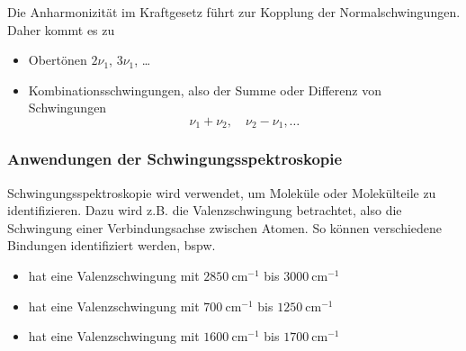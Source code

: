 	Die Anharmonizität im Kraftgesetz führt zur Kopplung der Normalschwingungen. Daher kommt es zu
	\begin{itemize}
		\item Obertönen $2 \nu_1$, $3 \nu_1$, \ldots
		\item Kombinationsschwingungen, also der Summe oder Differenz von Schwingungen
			$$
			\nu_1 + \nu_2, \quad \nu_2 - \nu_1, \ldots
			$$ 
	\end{itemize}

\subsubsection{Anwendungen der Schwingungsspektroskopie}
	Schwingungsspektroskopie wird verwendet, um Moleküle oder Molekülteile zu identifizieren. Dazu wird z.B. die Valenzschwingung betrachtet, also die Schwingung einer Verbindungsachse zwischen Atomen. So können verschiedene Bindungen identifiziert werden, bspw.
	\begin{itemize}
		\item {} hat eine Valenzschwingung mit $\SI{2850}{\centi \meter ^{-1}}$ bis $\SI{3000}{\centi \meter ^{-1}}$
		\item {} hat eine Valenzschwingung mit $\SI{700}{\centi \meter ^{-1}}$ bis $\SI{1250}{\centi \meter ^{-1}}$
		\item {} hat eine Valenzschwingung mit $\SI{1600}{\centi \meter ^{-1}}$ bis $\SI{1700}{\centi \meter ^{-1}}$
	\end{itemize}

